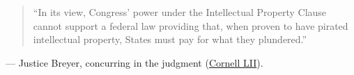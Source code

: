 \documentclass[12pt]{article}
\begin{document}
\begin{quote}
``In its view, Congress' power under the Intellectual Property Clause cannot support a federal law providing that, when proven to have pirated intellectual property, States must pay for what they plundered.''
\end{quote}
\noindent --- Justice Breyer, concurring in the judgment (\href{https://www.law.cornell.edu/supremecourt/text/18-877}{Cornell LII}).
\end{document}

